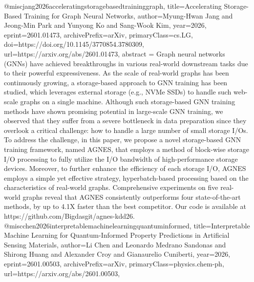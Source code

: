 {}@misc{jang2026acceleratingstoragebasedtraininggraph,
      title={Accelerating Storage-Based Training for Graph Neural Networks}, 
      author={Myung-Hwan Jang and Jeong-Min Park and Yunyong Ko and Sang-Wook Kim},
      year={2026},
      eprint={2601.01473},
      archivePrefix={arXiv},
      primaryClass={cs.LG},
      doi={https://doi.org/10.1145/3770854.3780309},
      url={https://arxiv.org/abs/2601.01473},
      abstract = {Graph neural networks (GNNs) have achieved breakthroughs in various real-world downstream tasks due to their powerful expressiveness. As the scale of real-world graphs has been continuously growing, a storage-based approach to GNN training has been studied, which leverages external storage (e.g., NVMe SSDs) to handle such web-scale graphs on a single machine. Although such storage-based GNN training methods have shown promising potential in large-scale GNN training, we observed that they suffer from a severe bottleneck in data preparation since they overlook a critical challenge: how to handle a large number of small storage I/Os. To address the challenge, in this paper, we propose a novel storage-based GNN training framework, named AGNES, that employs a method of block-wise storage I/O processing to fully utilize the I/O bandwidth of high-performance storage devices. Moreover, to further enhance the efficiency of each storage I/O, AGNES employs a simple yet effective strategy, hyperbatch-based processing based on the characteristics of real-world graphs. Comprehensive experiments on five real-world graphs reveal that AGNES consistently outperforms four state-of-the-art methods, by up to 4.1X faster than the best competitor. Our code is available at https://github.com/Bigdasgit/agnes-kdd26.}
}@misc{chen2026interpretablemachinelearningquantuminformed,
      title={Interpretable Machine Learning for Quantum-Informed Property Predictions in Artificial Sensing Materials}, 
      author={Li Chen and Leonardo Medrano Sandonas and Shirong Huang and Alexander Croy and Gianaurelio Cuniberti},
      year={2026},
      eprint={2601.00503},
      archivePrefix={arXiv},
      primaryClass={physics.chem-ph},
      url={https://arxiv.org/abs/2601.00503},
}

